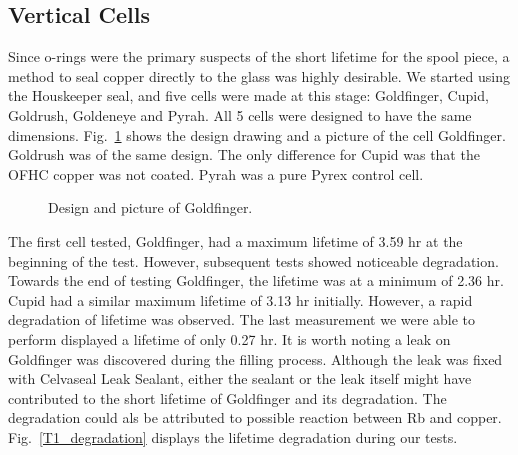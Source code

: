 \subsection{Vertical Cells}

Since o-rings were the primary suspects of the short lifetime for the spool piece, a method to seal copper directly to the glass was highly desirable. We started using the Houskeeper seal, and five cells were made at this stage: Goldfinger, Cupid, Goldrush, Goldeneye and Pyrah. All 5 cells were designed to have the same dimensions. Fig.~\ref{goldfinger} shows the design drawing and a picture of the cell Goldfinger. Goldrush was of the same design. The only difference for Cupid was that the OFHC copper was not coated. Pyrah was a pure Pyrex control cell. 

\begin{figure}[t!]
	\centering
	\caption{{Design and picture of Goldfinger. }}
	\label{goldfinger}
\end{figure}

The first cell tested, Goldfinger, had a maximum lifetime of 3.59 hr at the beginning of the test. However, subsequent tests showed noticeable degradation. Towards the end of testing Goldfinger, the lifetime was at a minimum of 2.36 hr. Cupid had a similar maximum lifetime of 3.13 hr initially. However, a rapid degradation of lifetime was observed. The last measurement we were able to perform displayed a lifetime of only 0.27 hr. It is worth noting a leak on Goldfinger was discovered during the filling process. Although the leak was fixed with Celvaseal Leak Sealant, either the sealant or the leak itself might have contributed to the short lifetime of Goldfinger and its degradation. The degradation could als be attributed to possible reaction between Rb and copper. Fig.~\ref{T1_degradation} displays the lifetime degradation during our tests.

